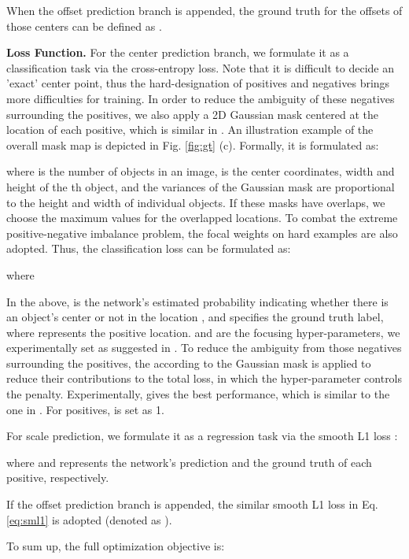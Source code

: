 When the offset prediction branch is appended, the ground truth for the offsets of those centers can be defined as .

\textbf{Loss Function.}
For the center prediction branch, we formulate it as a classification task via the cross-entropy loss. Note that it is difficult to decide an 'exact' center point, thus the hard-designation of positives and negatives brings more difficulties for training. In order to reduce the ambiguity of these negatives surrounding the positives, we also apply a 2D Gaussian mask  centered at the location of each positive, which is similar in \cite{Law_2018_ECCV,Song_2018_ECCV}. An illustration example of the overall mask map  is depicted in Fig. \ref{fig:gt} (c). Formally, it is formulated as:

where  is the number of objects in an image,  is the center coordinates, width and height of the th object, and the variances  of the Gaussian mask are proportional to the height and width of individual objects. If these masks have overlaps, we choose the maximum values for the overlapped locations.
To combat the extreme positive-negative imbalance problem, the focal weights \cite{lin2017focal} on hard examples are also adopted.
Thus, the classification loss can be formulated as:

where



In the above,  is the network's estimated probability indicating whether there is an object's center or not in the location , and  specifies the ground truth label, where  represents the positive location.  and  are the focusing hyper-parameters, we experimentally set  as suggested in \cite{lin2017focal}. To reduce the ambiguity from those negatives surrounding the positives, the  according to the Gaussian mask  is applied to reduce their contributions to the total loss, in which the hyper-parameter  controls the penalty. Experimentally,  gives the best performance, which is similar to the one in \cite{Law_2018_ECCV}. For positives,  is set as 1.

For scale prediction, we formulate it as a regression task via the smooth L1 loss \cite{girshick2015fast}:


where  and  represents the network's prediction and the ground truth of each positive, respectively.

If the offset prediction branch is appended, the similar smooth L1 loss in Eq. \ref{eq:sml1} is adopted (denoted as ).

To sum up, the full optimization objective is:


